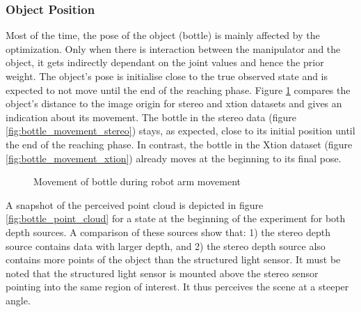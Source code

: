 \subsubsection{Object Position}

Most of the time, the pose of the object (bottle) is mainly affected by the optimization. Only when there is interaction between the manipulator and the object, it gets indirectly dependant on the joint values and hence the prior weight. The object's pose is initialise close to the true observed state and is expected to not move until the end of the reaching phase. Figure \ref{fig:bottle_movement} compares the object's distance to the image origin for stereo and xtion datasets and gives an indication about its movement. The bottle in the stereo data (figure \ref{fig:bottle_movement_stereo}) stays, as expected, close to its initial position until the end of the reaching phase. In contrast, the bottle in the Xtion dataset (figure \ref{fig:bottle_movement_xtion}) already moves at the beginning to its final pose.

\begin{figure}
\centering
{}
\caption{Movement of bottle during robot arm movement}
\label{fig:bottle_movement}
\end{figure}

A snapshot of the perceived point cloud is depicted in figure \ref{fig:bottle_point_cloud} for a state at the beginning of the experiment for both depth sources. A comparison of these sources show that: 1) the stereo depth source contains data with larger depth, and 2) the stereo depth source also contains more points of the object than the structured light sensor. It must be noted that the structured light sensor is mounted above the stereo sensor pointing into the same region of interest. It thus perceives the scene at a steeper angle.

